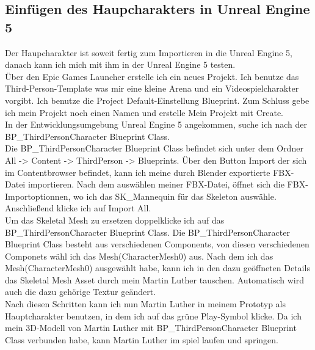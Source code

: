 {\subsection{Einfügen des Haupcharakters in Unreal Engine 5}
Der Haupcharakter ist soweit fertig zum Importieren in die Unreal Engine 5, danach kann ich mich mit ihm in der Unreal Engine 5 testen.
\\
Über den Epic Games Launcher erstelle ich ein neues Projekt. Ich benutze das Third-Person-Template was mir eine kleine Arena und ein Videospielcharakter vorgibt. Ich benutze die Project Default-Einstellung Blueprint. Zum Schluss gebe ich mein Projekt noch einen Namen und erstelle Mein Projekt mit Create.
\\
In der Entwicklungsumgebung Unreal Engine 5 angekommen, suche ich nach der BP\_ThirdPersonCharacter Blueprint Class.
\\
Die BP\_ThirdPersonCharacter Blueprint Class befindet sich unter dem Ordner All -> Content -> ThirdPerson -> Blueprints. Über den Button Import der sich im Contentbrowser befindet, kann ich meine durch Blender exportierte FBX-Datei importieren. Nach dem auswählen meiner FBX-Datei, öffnet sich die FBX-Importoptionnen, wo ich das SK\_Mannequin für das Skeleton auswähle. Anschließend klicke ich auf Import All.
\\
Um das Skeletal Mesh zu ersetzen doppelklicke ich auf das BP\_ThirdPersonCharacter Blueprint Class. Die BP\_ThirdPersonCharacter Blueprint Class besteht aus verschiedenen Components, von diesen verschiedenen Componets wähl ich das Mesh(CharacterMesh0) aus. Nach dem ich das Mesh(CharacterMesh0) ausgewählt habe, kann ich in den dazu geöffneten Details das Skeletal Mesh Asset durch mein Martin Luther tauschen. Automatisch wird auch die dazu gehörige Textur geändert.
\\
Nach diesen Schritten kann ich nun Martin Luther in meinem Prototyp als Hauptcharakter benutzen, in dem ich auf das grüne Play-Symbol klicke. Da ich mein 3D-Modell von Martin Luther mit BP\_ThirdPersonCharacter Blueprint Class verbunden habe, kann Martin Luther im spiel laufen und springen.

%
%
%
}
